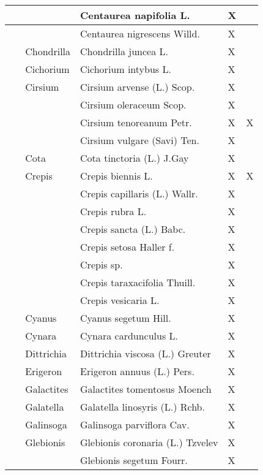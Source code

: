 \documentclass[main.tex]{subfiles}
\begin{document}
\begin{table}[!ht]
\begin{tabular}[\footnotesize]{|p{2.4cm}|p{1.9cm}|p{5.8cm}|p{1.1cm}|p{1cm}|}
        ~ & ~ & Centaurea napifolia L. & X & ~ \\ \hline
        ~ & ~ & Centaurea nigrescens Willd. & X & ~ \\ \hline
        ~ & Chondrilla & Chondrilla juncea L. & X & ~ \\ \hline
        ~ & Cichorium & Cichorium intybus L. & X & ~ \\ \hline
        ~ & Cirsium & Cirsium arvense (L.) Scop. & X & ~ \\ \hline
        ~ & ~ & Cirsium oleraceum Scop. & X & ~ \\ \hline
        ~ & ~ & Cirsium tenoreanum Petr. & X & X \\ \hline
        ~ & ~ & Cirsium vulgare (Savi) Ten. & X & ~ \\ \hline
        ~ & Cota & Cota tinctoria (L.) J.Gay & X & ~ \\ \hline
        ~ & Crepis & Crepis biennis L. & X & X \\ \hline
        ~ & ~ & Crepis capillaris (L.) Wallr. & X & ~ \\ \hline
        ~ & ~ & Crepis rubra L. & X & ~ \\ \hline
        ~ & ~ & Crepis sancta (L.) Babc. & X & ~ \\ \hline
        ~ & ~ & Crepis setosa Haller f. & X & ~ \\ \hline
        ~ & ~ & Crepis sp. & X & ~ \\ \hline
        ~ & ~ & Crepis taraxacifolia Thuill. & X & ~ \\ \hline
        ~ & ~ & Crepis vesicaria L. & X & ~ \\ \hline
        ~ & Cyanus & Cyanus segetum Hill. & X & ~ \\ \hline
        ~ & Cynara & Cynara cardunculus L. & X & ~ \\ \hline
        ~ & Dittrichia & Dittrichia viscosa (L.) Greuter & X & ~ \\ \hline
        ~ & Erigeron & Erigeron annuus (L.) Pers. & X & ~ \\ \hline
        ~ & Galactites & Galactites tomentosus Moench & X & ~ \\ \hline
        ~ & Galatella & Galatella linosyris (L.) Rchb. & X & ~ \\ \hline
        ~ & Galinsoga & Galinsoga parviflora Cav. & X & ~ \\ \hline
        ~ & Glebionis & Glebionis coronaria (L.) Tzvelev & X & ~ \\ \hline
        ~ & ~ & Glebionis segetum Fourr. & X & ~ \\ \hline

\end{tabular}
\end{table}
\end{document}
